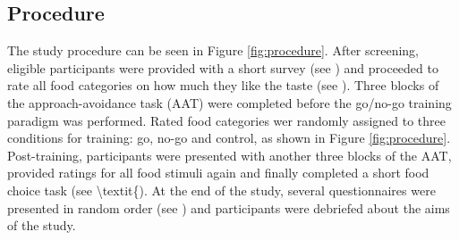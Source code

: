 \documentclass[man,floatsintext]{apa6}
\begin{document}
\hypertarget{procedure}{%
\subsection{Procedure}\label{procedure}}

The study procedure can be seen in Figure \ref{fig:procedure}. After screening, eligible participants were provided with a short survey (see \textit{}) and proceeded to rate all food categories on how much they like the taste (see \textit{}). Three blocks of the approach-avoidance task (AAT) were completed before the go/no-go training paradigm was performed. Rated food categories wer randomly assigned to three conditions for training: go, no-go and control, as shown in Figure \ref{fig:procedure}. Post-training, participants were presented with another three blocks of the AAT, provided ratings for all food stimuli again and finally completed a short food choice task (see \textbackslash textit\{). At the end of the study, several questionnaires were presented in random order (see \textit{}) and participants were debriefed about the aims of the study.
\end{document}
